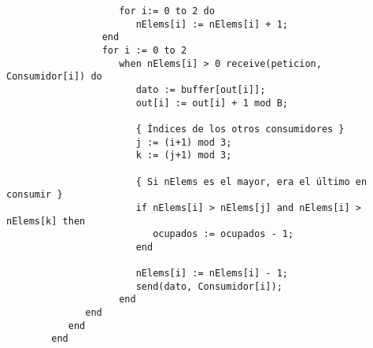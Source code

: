 \begin{ejercicio}
\begin{verbatim}
                    for i:= 0 to 2 do
                       nElems[i] := nElems[i] + 1;
                 end
                 for i := 0 to 2
                    when nElems[i] > 0 receive(peticion, Consumidor[i]) do
                       dato := buffer[out[i]];
                       out[i] := out[i] + 1 mod B;

                       { Índices de los otros consumidores }
                       j := (i+1) mod 3;
                       k := (j+1) mod 3;

                       { Si nElems es el mayor, era el último en consumir }
                       if nElems[i] > nElems[j] and nElems[i] > nElems[k] then
                          ocupados := ocupados - 1;
                       end

                       nElems[i] := nElems[i] - 1;
                       send(dato, Consumidor[i]);
                    end
              end
           end
        end
    \end{verbatim}
\end{ejercicio}

